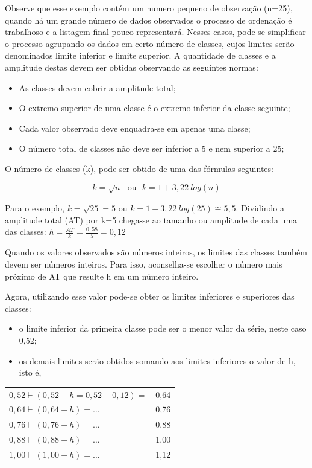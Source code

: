 Observe que esse exemplo contém um numero pequeno de observação (n=25), quando há um grande número de dados observados o processo de ordenação é trabalhoso e a listagem final pouco representará. Nesses casos, pode-se simplificar o processo agrupando os dados em certo número de classes, cujos limites serão denominados limite inferior e limite superior. A quantidade de classes e a amplitude destas devem ser obtidas observando as seguintes normas:

\begin{itemize}
  \item As classes devem cobrir a amplitude total;
  \item O extremo superior de uma classe é o extremo inferior da classe seguinte;
  \item Cada valor observado deve enquadra-se em apenas uma classe;
  \item O número total de classes não deve ser inferior a 5 e nem superior a 25;
\end{itemize}


O número de classes (k), pode ser obtido de uma das fórmulas seguintes:

$$ k=\sqrt{n} \ \ \ \mbox{ou} \ \ \  k=1+3,22 \ log(n)$$



Para o exemplo, $k=\sqrt{25}=5$ ou $k=1-3,22 \ log(25)\cong 5,5$. Dividindo a amplitude total (AT) por k=5 chega-se ao tamanho ou amplitude de cada uma das classes: $h=\frac{AT}{k}=\frac{0,58}{5}=0,12$\vskip0.3cm


Quando os valores observados são números inteiros, os limites das classes também devem ser números inteiros. Para isso, aconselha-se escolher o número mais próximo de AT que resulte h em um número inteiro.\vskip0.3cm


Agora, utilizando esse valor pode-se obter os limites inferiores e superiores das classes:



\begin{itemize}
  \item o limite inferior da primeira classe pode ser o menor valor da série, neste caso 0,52;
  \item os demais limites serão obtidos somando aos limites inferiores o valor de h, isto é,
\end{itemize}

\begin{table}[!htb]
    \centering
    {
    \label{}
    \vspace{-0.5cm}
\begin{tabular}{l|c}
\hline\hline  
  $0,52 \vdash (0,52+ h=0,52+0,12)=$ & 0,64 \\
  $0,64 \vdash (0,64+ h)= \ldots $   & 0,76 \\
  $0,76 \vdash (0,76+ h)= \ldots $   & 0,88 \\
  $0,88 \vdash (0,88+ h)= \ldots $   & 1,00 \\
  $1,00 \vdash (1,00+ h)= \ldots $   & 1,12 \\
\hline\hline    
\end{tabular}}
\end{table}


